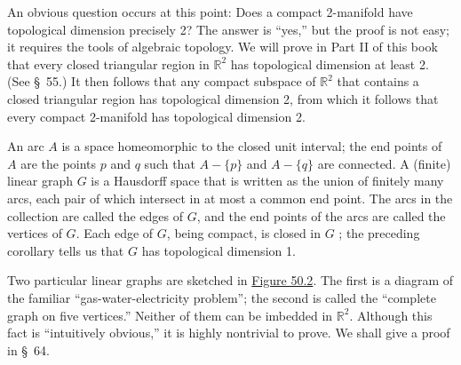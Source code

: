 An obvious question occurs at this point: Does a compact 2-manifold have topological dimension precisely 2? The answer is ``yes,'' but the proof is not easy; it requires the tools of algebraic topology. We will prove in Part II of this book that every closed triangular region in \(\mathbb{R}^{2}\) has topological dimension at least 2. (See \S\ 55.) It then follows that any compact subspace of \(\mathbb{R}^{2}\) that contains a closed triangular region has topological dimension 2, from which it follows that every compact 2-manifold has topological dimension 2.

\begin{centeredblock}
\begin{example}
\label{ex:\thesection.\theexample}
An arc \(A\) is a space homeomorphic to the closed unit interval; the end points of \(A\) are the points \(p\) and \(q\) such that \(A - \{ p\}\) and \(A - \{ q\}\) are connected. A (finite) linear graph \(G\) is a Hausdorff space that is written as the union of finitely many arcs, each pair of which intersect in at most a common end point. The arcs in the collection are called the edges of \(G\), and the end points of the arcs are called the vertices of \(G\). Each edge of \(G\), being compact, is closed in \(G\) ; the preceding corollary tells us that \(G\) has topological dimension 1.
\end{example}
\end{centeredblock}

Two particular linear graphs are sketched in \hyperref[fig:50.2]{Figure 50.2}. The first is a diagram of the familiar ``gas-water-electricity problem''; the second is called the ``complete graph on five vertices.'' Neither of them can be imbedded in \(\mathbb{R}^{2}\). Although this fact is ``intuitively obvious,'' it is highly nontrivial to prove. We shall give a proof in \S\ 64.

